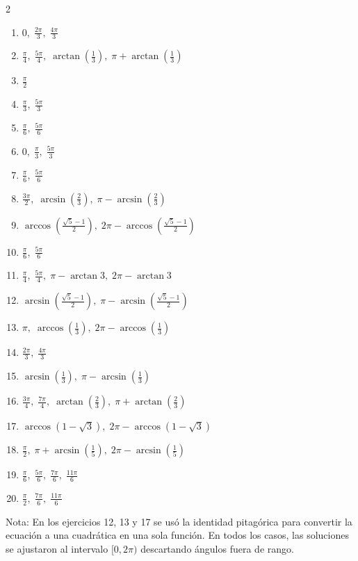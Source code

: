 \documentclass[12pt,a4paper]{article}
\begin{document}
\begin{multicols}{2}
\begin{enumerate}[leftmargin=*,label=\arabic*.]
    \item $\displaystyle 0,\; \frac{2\pi}{3},\; \frac{4\pi}{3}$
    \item $\displaystyle \frac{\pi}{4},\; \frac{5\pi}{4},\; \arctan\!\left(\frac{1}{3}\right),\; \pi + \arctan\!\left(\frac{1}{3}\right)$
    \item $\displaystyle \frac{\pi}{2}$
    \item $\displaystyle \frac{\pi}{3},\; \frac{5\pi}{3}$
    \item $\displaystyle \frac{\pi}{6},\; \frac{5\pi}{6}$
    \item $\displaystyle 0,\; \frac{\pi}{3},\; \frac{5\pi}{3}$
    \item $\displaystyle \frac{\pi}{6},\; \frac{5\pi}{6}$
    \item $\displaystyle \frac{3\pi}{2},\; \arcsin\!\left(\frac{2}{3}\right),\; \pi - \arcsin\!\left(\frac{2}{3}\right)$
    \item $\displaystyle \arccos\!\left(\frac{\sqrt{5}-1}{2}\right),\; 2\pi - \arccos\!\left(\frac{\sqrt{5}-1}{2}\right)$
    \item $\displaystyle \frac{\pi}{6},\; \frac{5\pi}{6}$
    \item $\displaystyle \frac{\pi}{4},\; \frac{5\pi}{4},\; \pi - \arctan 3,\; 2\pi - \arctan 3$
    \item $\displaystyle \arcsin\!\left(\frac{\sqrt{5}-1}{2}\right),\; \pi - \arcsin\!\left(\frac{\sqrt{5}-1}{2}\right)$
    \item $\displaystyle \pi,\; \arccos\!\left(\frac{1}{3}\right),\; 2\pi - \arccos\!\left(\frac{1}{3}\right)$
    \item $\displaystyle \frac{2\pi}{3},\; \frac{4\pi}{3}$
    \item $\displaystyle \arcsin\!\left(\frac{1}{3}\right),\; \pi - \arcsin\!\left(\frac{1}{3}\right)$
    \item $\displaystyle \frac{3\pi}{4},\; \frac{7\pi}{4},\; \arctan\!\left(\frac{2}{3}\right),\; \pi + \arctan\!\left(\frac{2}{3}\right)$
    \item $\displaystyle \arccos(1-\sqrt{3}),\; 2\pi - \arccos(1-\sqrt{3})$
    \item $\displaystyle \frac{\pi}{2},\; \pi + \arcsin\!\left(\frac{1}{5}\right),\; 2\pi - \arcsin\!\left(\frac{1}{5}\right)$
    \item $\displaystyle \frac{\pi}{6},\; \frac{5\pi}{6},\; \frac{7\pi}{6},\; \frac{11\pi}{6}$
    \item $\displaystyle \frac{\pi}{2},\; \frac{7\pi}{6},\; \frac{11\pi}{6}$
\end{enumerate}
\end{multicols}

\vspace{1cm}
{\small Nota: En los ejercicios 12, 13 y 17 se usó la identidad pitagórica para convertir la ecuación a una cuadrática en una sola función. En todos los casos, las soluciones se ajustaron al intervalo $[0,2\pi)$ descartando ángulos fuera de rango.}
\end{document}
